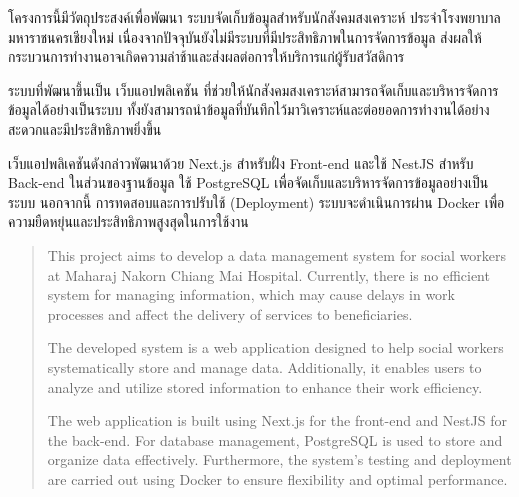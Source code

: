 \maketitle
\makesignature

\ifproject
\begin{abstractTH}

โครงการนี้มีวัตถุประสงค์เพื่อพัฒนา ระบบจัดเก็บข้อมูลสำหรับนักสังคมสงเคราะห์ ประจำโรงพยาบาลมหาราชนครเชียงใหม่ เนื่องจากปัจจุบันยังไม่มีระบบที่มีประสิทธิภาพในการจัดการข้อมูล ส่งผลให้กระบวนการทำงานอาจเกิดความล่าช้าและส่งผลต่อการให้บริการแก่ผู้รับสวัสดิการ

ระบบที่พัฒนาขึ้นเป็น เว็บแอปพลิเคชัน ที่ช่วยให้นักสังคมสงเคราะห์สามารถจัดเก็บและบริหารจัดการข้อมูลได้อย่างเป็นระบบ ทั้งยังสามารถนำข้อมูลที่บันทึกไว้มาวิเคราะห์และต่อยอดการทำงานได้อย่างสะดวกและมีประสิทธิภาพยิ่งขึ้น

เว็บแอปพลิเคชันดังกล่าวพัฒนาด้วย Next.js สำหรับฝั่ง Front-end และใช้ NestJS สำหรับ Back-end ในส่วนของฐานข้อมูล ใช้ PostgreSQL เพื่อจัดเก็บและบริหารจัดการข้อมูลอย่างเป็นระบบ นอกจากนี้ การทดสอบและการปรับใช้ (Deployment) ระบบจะดำเนินการผ่าน Docker เพื่อความยืดหยุ่นและประสิทธิภาพสูงสุดในการใช้งาน
\end{abstractTH}

\begin{abstract}

This project aims to develop a data management system for social workers at Maharaj Nakorn Chiang Mai Hospital. Currently, there is no efficient system for managing information, which may cause delays in work processes and affect the delivery of services to beneficiaries.

The developed system is a web application designed to help social workers systematically store and manage data. Additionally, it enables users to analyze and utilize stored information to enhance their work efficiency.
    
The web application is built using Next.js for the front-end and NestJS for the back-end. For database management, PostgreSQL is used to store and organize data effectively. Furthermore, the system's testing and deployment are carried out using Docker to ensure flexibility and optimal performance.
\end{abstract}

\iffalse
\begin{dedication}
This document is dedicated to all Chiang Mai University students.

Dedication page is optional.
\end{dedication}
\fi %

